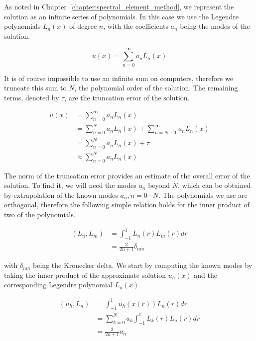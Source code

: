 As noted in Chapter~\ref{chapter:spectral_element_method}, we represent the solution as an infinite
series of polynomials. In this case we use the Legendre polynomials \(L_n(x)\) of degree \(n\), with
the coefficients \(a_n\) being the modes of the solution.

\begin{equation} \label{equ:infinite_sum_amr}
    u(x) = \sum_{n = 0}^{\infty}a_n L_n(x)
\end{equation}

It is of course impossible to use an infinite sum on computers, therefore we truncate this sum to
\(N\), the polynomial order of the solution. The remaining terms, denoted by \(\tau \), are the
truncation error of the solution.

\begin{equation} \label{equ:solution_approximation}
    \begin{aligned}
        u(x) &= \sum_{n = 0}^{\infty } a_n L_n(x) \\
        &= \sum_{n = 0}^{N}a_n L_n(x) + \sum_{n = N + 1}^{\infty }a_n L_n(x) \\ 
        &= \sum_{n = 0}^{N}a_n L_n(x) + \tau \\
        &\approx \sum_{n = 0}^{N}a_n L_n(x)
    \end{aligned}
\end{equation}

The norm of the truncation error provides an estimate of the overall error of the solution. To find
it, we will need the modes \(a_n\) beyond \(N\), which can be obtained by extrapolation of the known
modes \(a_n, n = 0 \cdots N\). The polynomials we use are orthogonal, therefore the following simple
relation holds for the inner product of two of the polynomials.

\begin{equation} \label{equ:polynomial_orthogonality}
    \begin{aligned}
        \left( L_n, L_m \right) &= \int_{-1}^{1}L_n(r)L_m(r)dr \\
        &= \frac{2}{2n + 1}\delta _{n m}
    \end{aligned}
\end{equation}

\noindent
with \(\delta_{n m}\) being the Kronecker delta. We start by computing the known modes by taking the
inner product of the approximate solution \(u_h(x)\) and  the corresponding Legendre polynomial
\(L_n(x)\).

\begin{equation} \label{equ:modes_inner_product}
    \begin{aligned}
        \left( u_h, L_n \right) &= \int_{-1}^{1} u_h(x(r)) L_n(r) dr \\
        &= \sum_{k = 0}^{N} a_k \int_{-1}^{1} L_k(r) L_n(r)dr \\
        &= \frac{2}{2n + 1} a_n
    \end{aligned}
\end{equation}


